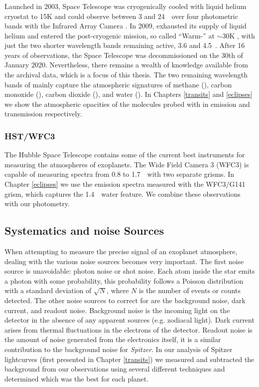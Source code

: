 \subsubsection{\spitzerIRAC}

Launched in 2003, \spitzer Space Telescope was cryogenically cooled with liquid helium cryostat to 15K and could observe between 3 and 24~\um~over four photometric bands with the Infrared Array Camera \citep[IRAC,][]{Fazio2004}. In 2009, \spitzer exhausted its supply of liquid helium and entered the post-cryogenic mission, so called ``Warm-\spitzer'' at $\sim$30K \citep{Mcmurtry2006}, with just the two shorter wavelength bands remaining active, 3.6 and 4.5~\um. After 16 years of observations, the \spitzer Space Telescope was decommissioned on the 30th of January 2020. Nevertheless, there remains a wealth of knowledge available from the archival data, which is a focus of this thesis. The two remaining wavelength bands of \spitzerIRAC mainly capture the atmospheric signatures of methane (), carbon monoxide (), carbon dioxide (), and water (). In Chapters \ref{transits} and \ref{eclipses} we show the atmospheric opacities of the molecules probed with \spitzerIRAC in emission and transmission respectively.

\subsubsection{HST/WFC3}

The Hubble Space Telescope contains some of the current best instruments for measuring the atmospheres of exoplanets. The Wide Field Camera 3 (WFC3) is capable of measuring spectra from 0.8 to 1.7~\um~with two separate grisms. In Chapter \ref{eclipses} we use the emission spectra measured with the WFC3/G141 grism, which captures the 1.4~\um~water feature. We combine these observations with our \spitzerIRAC photometry.

\subsection{Systematics and noise Sources}

When attempting to measure the precise signal of an exoplanet atmosphere, dealing with the various noise sources becomes very important. The first noise source is unavoidable: photon noise or shot noise. Each atom inside the star emits a photon with some probability, this probability follows a Poisson distribution with a standard deviation of $\sqrt{N}$, where $N$ is the number of events or counts detected. The other noise sources to correct for are the background noise, dark current, and readout noise. Background noise is the incoming light on the detector in the absence of any apparent sources (e.g. zodiacal light). Dark current arises from thermal fluctuations in the electrons of the detector. Readout noise is the amount of noise generated from the electronics itself, it is a similar contribution to the background noise for \textit{Spitzer}. In our analysis of Spitzer lightcurves (first presented in Chapter \ref{transits}) we measured and subtracted the background from our observations using several different techniques and determined which was the best for each planet.

